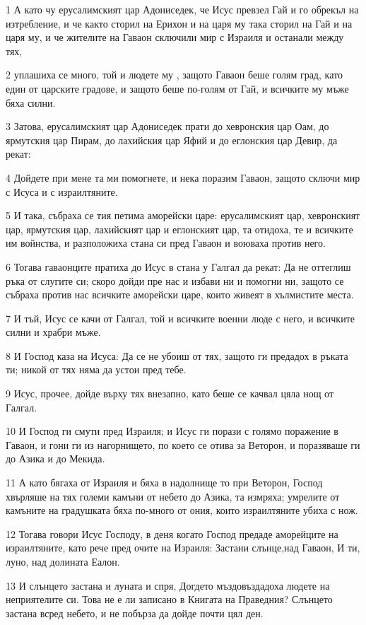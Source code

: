 \par 1 А като чу ерусалимският цар Адониседек, че Исус превзел Гай и го обрекъл на изтребление, и че както сторил на Ерихон и на царя му така сторил на Гай и на царя му, и че жителите на Гаваон сключили мир с Израиля и останали между тях,
\par 2 уплашиха се много, той и людете му , защото Гаваон беше голям град, като един от царските градове, и защото беше по-голям от Гай, и всичките му мъже бяха силни.
\par 3 Затова, ерусалимският цар Адониседек прати до хевронския цар Оам, до ярмутския цар Пирам, до лахийския цар Яфий и до еглонския цар Девир, да рекат:
\par 4 Дойдете при мене та ми помогнете, и нека поразим Гаваон, защото сключи мир с Исуса и с израилтяните.
\par 5 И така, събраха се тия петима аморейски царе: ерусалимският цар, хевронският цар, ярмутския цар, лахийският цар и еглонският цар, та отидоха, те и всичките им войнства, и разположиха стана си пред Гаваон и воюваха против него.
\par 6 Тогава гаваонците пратиха до Исус в стана у Галгал да рекат: Да не оттеглиш ръка от слугите си; скоро дойди пре нас и избави ни и помогни ни, защото се събраха против нас всичките аморейски царе, които живеят в хълмистите места.
\par 7 И тъй, Исус се качи от Галгал, той и всичките военни люде с него, и всичките силни и храбри мъже.
\par 8 И Господ каза на Исуса: Да се не убоиш от тях, защото ги предадох в ръката ти; никой от тях няма да устои пред тебе.
\par 9 Исус, прочее, дойде върху тях внезапно, като беше се качвал цяла нощ от Галгал.
\par 10 И Господ ги смути пред Израиля; и Исус ги порази с голямо поражение в Гаваон, и гони ги из нагорнището, по което се отива за Веторон, и поразяваше ги до Азика и до Мекида.
\par 11 А като бягаха от Израиля и бяха в надолнище то при Веторон, Господ хвърляше на тях големи камъни от небето до Азика, та измряха; умрелите от камъните на градушката бяха по-много от ония, които израилтяните убиха с нож.
\par 12 Тогава говори Исус Господу, в деня когато Господ предаде аморейците на израилтяните, като рече пред очите на Израиля: Застани слънце,над Гаваон, И ти, луно, над долината Еалон.
\par 13 И слънцето застана и луната и спря, Догдето мъздовъздадоха людете на неприятелите си. Това не е ли записано в Книгата на Праведния? Слънцето застана всред небето, и не побърза да дойде почти цял ден.
